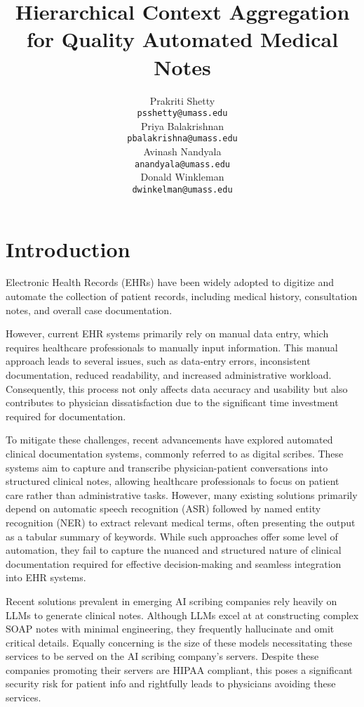 \documentclass[11pt,a4paper]{article}
\title{Hierarchical Context Aggregation for Quality Automated Medical Notes}
\author{Prakriti Shetty \\
  {\tt \small psshetty@umass.edu} \\\And
  Priya Balakrishnan \\
  {\tt \small pbalakrishna@umass.edu} \\\And
  Avinash Nandyala \\
  {\tt \small anandyala@umass.edu} \\\And
  Donald Winkleman \\
  {\tt \small dwinkelman@umass.edu} \\}
\date{}
\begin{document}
\maketitle

\section{Introduction}
Electronic Health Records (EHRs) have been widely adopted to digitize and automate the collection of patient records, including medical history, consultation notes, and overall case documentation.

However, current EHR systems primarily rely on manual data entry, which requires healthcare professionals to manually input information. This manual approach leads to several issues, such as data-entry errors, inconsistent documentation, reduced readability, and increased administrative workload. Consequently, this process not only affects data accuracy and usability but also contributes to physician dissatisfaction due to the significant time investment required for documentation. 

To mitigate these challenges, recent advancements have explored automated clinical documentation systems, commonly referred to as digital scribes. These systems aim to capture and transcribe physician-patient conversations into structured clinical notes, allowing healthcare professionals to focus on patient care rather than administrative tasks. However, many existing solutions primarily depend on automatic speech recognition (ASR) followed by named entity recognition (NER) to extract relevant medical terms, often presenting the output as a tabular summary of keywords. While such approaches offer some level of automation, they fail to capture the nuanced and structured nature of clinical documentation required for effective decision-making and seamless integration into EHR systems. 

Recent solutions prevalent in emerging AI scribing companies rely heavily on LLMs to generate clinical notes. Although LLMs excel at at constructing complex SOAP notes with minimal engineering, they frequently hallucinate and omit critical details. Equally concerning is the size of these models necessitating these services to be served on the AI scribing company's servers. Despite these companies promoting their servers are HIPAA compliant, this poses a significant security risk for patient info and rightfully leads to physicians avoiding these services.
\end{document}
